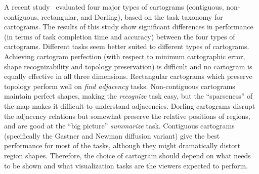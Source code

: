 \documentclass{egpubl}
\begin{document}
A recent study~\cite{NusratAK15} evaluated four major types of cartograms (contiguous, non-contiguous, rectangular, and Dorling), based on the task taxonomy for cartograms.
The results of this study show significant differences in performance (in terms of task completion time and accuracy) between the four types of cartograms. Different tasks seem better suited to different types of cartograms. 
Achieving cartogram perfection (with respect to minimum cartographic error, shape recognizability and topology preservation) is difficult and no cartogram is equally effective in all three dimensions. Rectangular cartograms which preserve topology perform well on \textit{find adjacency} tasks. Non-contiguous cartograms maintain perfect shapes, making the \textit{recognize} task easy, but the ``sparseness'' of the map makes it difficult to understand adjacencies. Dorling cartograms disrupt the adjacency relations but somewhat preserve the relative positions of regions, and are good at the ``big picture'' \textit{summarize} task. Contiguous cartograms (specifically the Gastner and Newman diffusion variant) give the best performance for most of the tasks, although they might dramatically distort region shapes. Therefore, the choice of cartogram should depend on what needs to be shown and  what visualization tasks are the viewers expected to perform.
\end{document}
